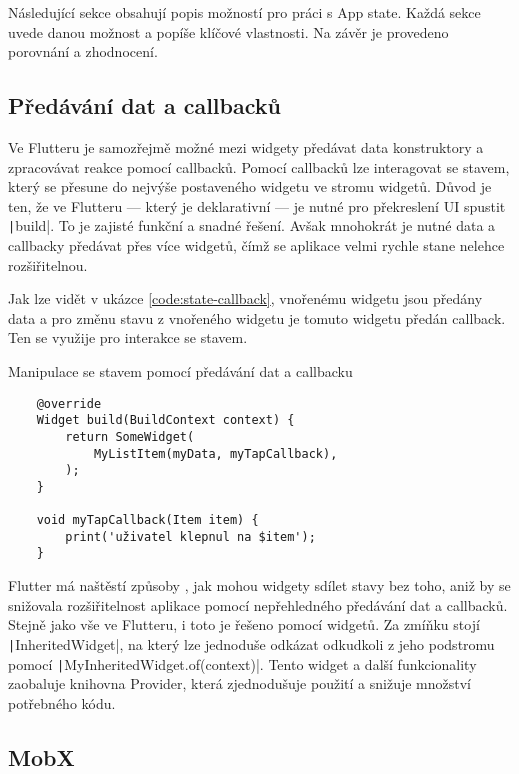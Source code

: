 Následující sekce obsahují popis možností pro práci s App state.
Každá sekce uvede danou možnost a popíše klíčové vlastnosti.
Na závěr je provedeno porovnání a zhodnocení. 

\subsection{Předávání dat a callbacků}
\label{sec:data-callback-transfer}

Ve Flutteru je samozřejmě možné \cite{flutter_state_mgmt_simple} mezi widgety
předávat data konstruktory
a zpracovávat reakce pomocí callbacků. 
Pomocí callbacků lze interagovat se stavem,
který se přesune do nejvýše postaveného widgetu ve stromu widgetů.
Důvod je ten,
že ve Flutteru
--- který je deklarativní ---
je nutné pro překreslení UI spustit \texttt|build|.
To je zajisté funkční a snadné řešení.
Avšak mnohokrát je nutné data a callbacky předávat přes více widgetů,
čímž se aplikace velmi rychle stane nelehce rozšiřitelnou.

Jak lze vidět v ukázce \ref{code:state-callback},
vnořenému widgetu jsou předány data
a pro změnu stavu z vnořeného widgetu je tomuto widgetu předán callback.
Ten se využije pro interakce se stavem.

\begin{listing}
    \caption{Manipulace se stavem pomocí předávání dat a callbacku
\cite{flutter_state_mgmt_simple}}
    \label{code:state-callback}
    \begin{verbatim}
    @override
    Widget build(BuildContext context) {
        return SomeWidget(
            MyListItem(myData, myTapCallback),
        );
    }

    void myTapCallback(Item item) {
        print('uživatel klepnul na $item');
    }
    \end{verbatim}
\end{listing}

Flutter má naštěstí způsoby \cite{flutter_state_mgmt_simple},
jak mohou widgety sdílet stavy bez toho,
aniž by se snižovala rozšiřitelnost aplikace pomocí nepřehledného předávání
dat a callbacků.
Stejně jako vše ve Flutteru,
i toto je řešeno pomocí widgetů.
Za zmíňku stojí \texttt|InheritedWidget|,
na který lze jednoduše odkázat odkudkoli z jeho podstromu pomocí
\texttt|MyInheritedWidget.of(context)|.
Tento widget a další funkcionality zaobaluje knihovna Provider,
která zjednodušuje použití a snižuje množství potřebného kódu.

\subsection{MobX}

